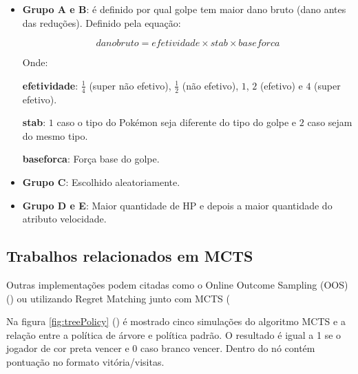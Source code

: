 \begin{itemize}
	
	\item \textbf{Grupo A e B}: é definido por qual golpe tem maior dano bruto (dano antes das reduções). Definido pela equação:
	
	\begin{equation}
		danobruto = efetividade \times stab \times baseforca
	\end{equation}
	
	Onde:
	
		\subitem \textbf{efetividade}: $\frac{1}{4}$ (super não efetivo), $\frac{1}{2}$ (não efetivo), $1$, $2$ (efetivo) e $4$ (super efetivo).
		
		\subitem \textbf{stab}: $1$ caso o tipo do Pokémon seja diferente do tipo do golpe e $2$ caso sejam do mesmo tipo.
		
		\subitem \textbf{baseforca}: Força base do golpe.
	
	\item \textbf{Grupo C}: Escolhido aleatoriamente.
	
	\item \textbf{Grupo D e E}: Maior quantidade de HP e depois a maior quantidade do atributo velocidade.
	
\end{itemize}

\subsection{Trabalhos relacionados em MCTS}

Outras implementações podem citadas como o Online Outcome Sampling (OOS) (\cite{Lanctot2014}) ou utilizando Regret Matching junto com MCTS (\cite{tak2014monte}




Na figura \ref{fig:treePolicy} (\cite{gelly2011monte}) é mostrado cinco simulações do algoritmo MCTS e a relação entre a política de árvore e política padrão. O resultado é igual a 1 se o jogador de cor preta vencer e 0 caso branco vencer. Dentro do nó contém pontuação no formato vitória/visitas.

